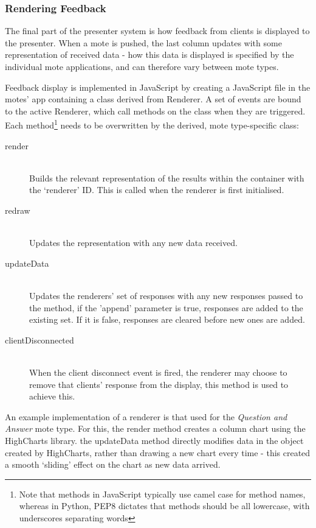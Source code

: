 \documentclass[a4papert,11pt,notitlepage]{ltxdoc}
\begin{document}
\subsubsection{Rendering Feedback}
The final part of the presenter system is how feedback from clients is displayed to the presenter. When a mote is pushed, the last column updates with some representation of received data - how this data is displayed is specified by the individual mote applications, and can therefore vary between mote types.

Feedback display is implemented in JavaScript by creating a JavaScript file in the motes' app containing a class derived from Renderer. A set of events are bound to the active Renderer, which call methods on the class when they are triggered. Each method\footnote{Note that methods in JavaScript typically use camel case for method names, whereas in Python, PEP8 dictates that methods should be all lowercase, with underscores separating words} needs to be overwritten by the derived, mote type-specific class:
\begin{description}
\item[render] \hfill \\
Builds the relevant representation of the results within the container with the `renderer' ID. This is called when the renderer is first initialised.
\item[redraw] \hfill \\
Updates the representation with any new data received.
\item[updateData] \hfill \\
Updates the renderers' set of responses with any new responses passed to the method, if the 'append' parameter is true, responses are added to the existing set. If it is false, responses are cleared before new ones are added.
\item[clientDisconnected] \hfill \\
When the client disconnect event is fired, the renderer may choose to remove that clients' response from the display, this method is used to achieve this.
\end{description}

An example implementation of a renderer is that used for the \emph{Question and Answer} mote type. For this, the render method creates a column chart using the HighCharts\cite{highcharts:web} library. the updateData method directly modifies data in the object created by HighCharts, rather than drawing a new chart every time - this created a smooth `sliding' effect on the chart as new data arrived.
\end{document}
